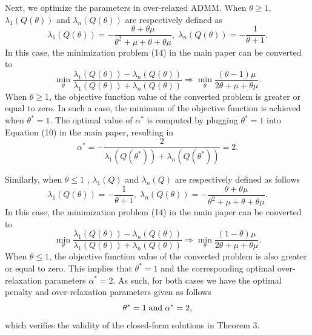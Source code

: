 \documentclass[letterpaper]{article} %
\begin{document}
Next, we optimize the parameters in over-relaxed ADMM. When $\theta\geq 1$, $\lambda_1(Q(\theta))$ and $\lambda_n(Q(\theta))$ are respectively defined as
\begin{equation*}
	\lambda_1(Q(\theta)) =- \frac{\theta +\theta\mu  }{\theta^2+\mu +\theta +\theta\mu },\; \lambda_n(Q(\theta))=-\frac{1}{\theta+1}.
\end{equation*}
In this case, the minimization problem (14) in the main paper can be converted to
\begin{equation*}
	\min_{\theta} \frac{\lambda_1 (Q\left(\theta\right))-\lambda_n (Q\left(\theta\right))}{\lambda_1\left(Q\left(\theta\right)\right)+\lambda_n\left(Q\left(\theta\right)\right)} \Rightarrow  \min_{\theta} \frac{(\theta -1)\mu}{2\theta+\mu+\theta\mu}.
\end{equation*}
When $\theta\geq 1$, the objective function value of the converted problem is greater or equal to zero. In such a case, the minimum of the objective function is achieved when $\theta^* = 1$. The optimal value of $\alpha^*$ is computed by plugging $\theta^* = 1$ into Equation (10) in the main paper, resulting in
\begin{equation*}
	\alpha^* = -\frac{2}{\lambda_1\left(Q\left(\theta^*\right)\right)+\lambda_n\left(Q\left(\theta^*\right)\right)}=2.
\end{equation*}

Similarly, when $\theta\leq1$ , $\lambda_1(Q)$ and $\lambda_n(Q)$ are respectively defined as follows
\begin{equation*}
	\lambda_1(Q(\theta)) =-\frac{1}{\theta+1},\; \lambda_n(Q(\theta))=- \frac{\theta +\theta\mu  }{\theta^2+\mu +\theta +\theta\mu }.
\end{equation*}
In this case, the minimization problem (14) in the main paper can be converted to
\begin{equation*}
	\min_{\theta} \frac{\lambda_1 (Q\left(\theta\right))-\lambda_n (Q\left(\theta\right))}{\lambda_1\left(Q\left(\theta\right)\right)+\lambda_n\left(Q\left(\theta\right)\right)} \Rightarrow \min_{\theta} \frac{(1-\theta )\mu}{2\theta+\mu+\theta\mu}.
\end{equation*}
When $\theta \leq 1$, the objective function value of the converted problem is also greater or equal to zero. This implies that  $\theta^*= 1$ and the corresponding optimal over-relaxation parameters $\alpha^*=2$. As such, for both cases we have the optimal penalty and over-relaxation parameters given as follows
\begin{equation*}
	\theta^*=1 \; \rm{and} \; \alpha^*=2,
\end{equation*}
which verifies the validity of the closed-form solutions in Theorem 3.
\end{document}
